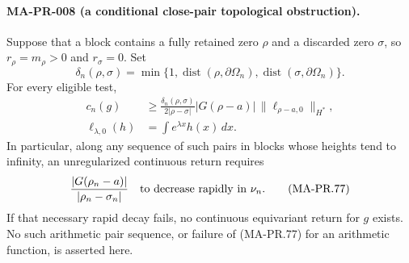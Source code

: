 \paragraph{MA-PR-008 (a conditional close-pair topological obstruction).}
Suppose that a block contains a fully retained zero \(\rho\)
and a discarded zero \(\sigma\), so \(r_\rho=m_\rho>0\)
and \(r_\sigma=0\).  Set
\[
 \delta_n(\rho,\sigma)
  =\min\{1,\operatorname{dist}(\rho,\partial\Omega_n),
                  \operatorname{dist}(\sigma,\partial\Omega_n)\}.
 \tag{MA-PR.75}
\]
For every eligible test,
\[
 \begin{aligned}
 c_n(g)&\ge
 \frac{\delta_n(\rho,\sigma)}{2|\rho-\sigma|}
       |G(\rho-a)|\,\|\ell_{\rho-a,0}\|_{H^*},\\
 \ell_{\lambda,0}(h)&=\int e^{\lambda x}h(x)\,dx .
 \end{aligned}
 \tag{MA-PR.76}
\]
In particular, along any sequence of such pairs in blocks
whose heights tend to infinity, an unregularized continuous
return requires
\[
       \frac{|G(\rho_n-a)|}{|\rho_n-\sigma_n|}
                       \quad\hbox{to decrease rapidly in }\nu_n .
 \tag{MA-PR.77}
\]
If that necessary rapid decay fails, no continuous
equivariant return for \(g\) exists.
No such arithmetic pair sequence, or failure of
(MA-PR.77) for an arithmetic function, is asserted here.

